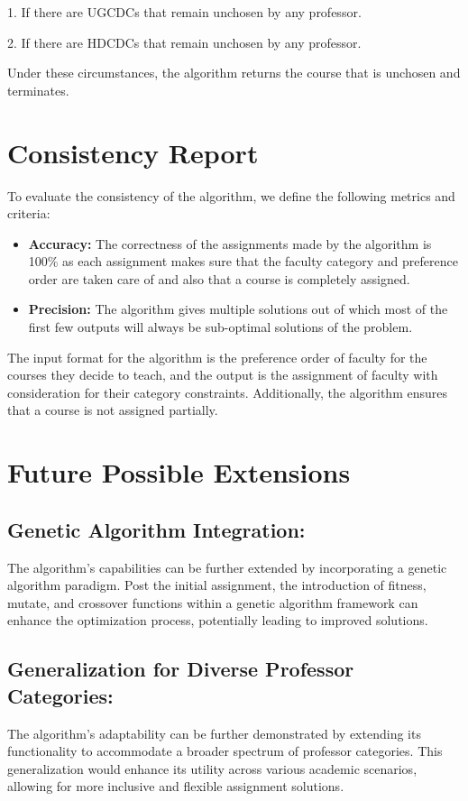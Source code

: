 \documentclass{article}
\begin{document}
1. If there are UGCDCs that remain unchosen by any professor.

2. If there are HDCDCs that remain unchosen by any professor.

Under these circumstances, the algorithm returns the course that is unchosen and terminates.
\section{Consistency Report}

To evaluate the consistency of the algorithm, we define the following metrics and criteria:

\begin{itemize}
    \item \textbf{Accuracy:} The correctness of the assignments made by the algorithm is 100\% as each assignment makes sure that the faculty category and preference order are taken care of and also that a course is completely assigned.
    \item \textbf{Precision:} The algorithm gives multiple solutions out of which most of the first few outputs will always be sub-optimal solutions of the problem.
\end{itemize}

The input format for the algorithm is the preference order of faculty for the courses they decide to teach, and the output is the assignment of faculty with consideration for their category constraints. Additionally, the algorithm ensures that a course is not assigned partially.


\section{Future Possible Extensions}

\subsection{Genetic Algorithm Integration:}
The algorithm's capabilities can be further extended by incorporating a genetic algorithm paradigm. Post the initial assignment, the introduction of fitness, mutate, and crossover functions within a genetic algorithm framework can enhance the optimization process, potentially leading to improved solutions.

\subsection{Generalization for Diverse Professor Categories:}
The algorithm's adaptability can be further demonstrated by extending its functionality to accommodate a broader spectrum of professor categories. This generalization would enhance its utility across various academic scenarios, allowing for more inclusive and flexible assignment solutions.
\end{document}
